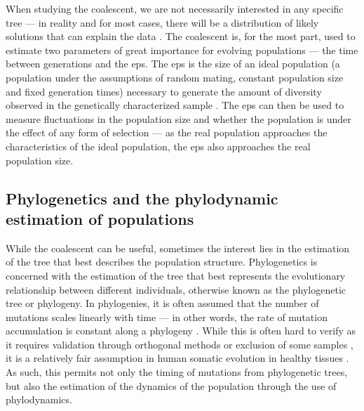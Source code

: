 When studying the coalescent, we are not necessarily interested in any specific tree --- in reality and for most cases, there will be a distribution of likely solutions that can explain the data \cite{Gillespie2004-xo}. The coalescent is, for the most part, used to estimate two parameters of great importance for evolving populations --- the time between generations and the \ac{eps}. The \ac{eps} is the size of an ideal population (a population under the assumptions of random mating, constant population size and fixed generation times) necessary to generate the amount of diversity observed in the genetically characterized sample \cite{Gillespie2004-xo}. The \ac{eps} can then be used to measure fluctuations in the population size and whether the population is under the effect of any form of selection --- as the real population approaches the characteristics of the ideal population, the \ac{eps} also approaches the real population size.

\subsection{Phylogenetics and the phylodynamic estimation of populations}

While the coalescent can be useful, sometimes the interest lies in the estimation of the tree that best describes the population structure. Phylogenetics is concerned with the estimation of the tree that best represents the evolutionary relationship between different individuals, otherwise known as the phylogenetic tree or phylogeny. In phylogenies, it is often assumed that the number of mutations scales linearly with time --- in other words, the rate of mutation accumulation is constant along a phylogeny \cite{Roy2014-ez}. While this is often hard to verify as it requires validation through orthogonal methods or exclusion of some samples \cite{Roy2014-ez}, it is a relatively fair assumption in human somatic evolution in healthy tissues \cite{Abascal_2021_gjvqfm,Mitchell2021-zl,Fabre2020-as}. As such, this permits not only the timing of mutations from phylogenetic trees, but also the estimation of the dynamics of the population through the use of phylodynamics. 

